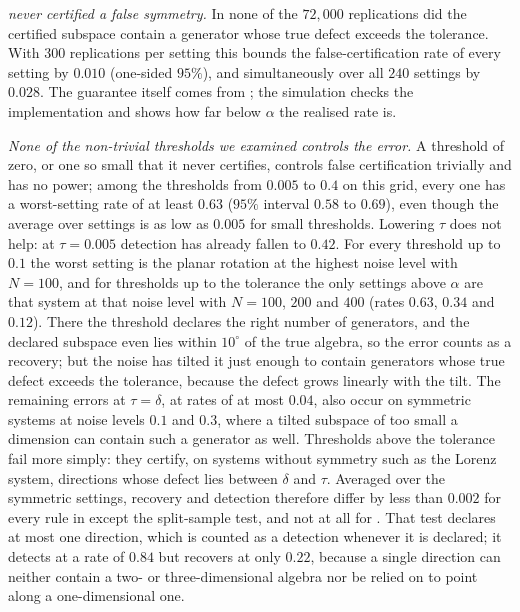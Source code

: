 \symcert{} \emph{never certified a false symmetry.} In none of the $72{,}000$
replications did the certified subspace contain a generator whose true defect
exceeds the tolerance. With $300$ replications per setting this bounds the
false-certification rate of every setting by $0.010$ (one-sided $95\%$), and
simultaneously over all $240$ settings by $0.028$. The guarantee itself comes
from ; the simulation checks the implementation and
shows how far below $\alpha$ the realised rate is.

\emph{None of the non-trivial thresholds we examined controls the error.} A
threshold of zero, or one so small that it never certifies, controls false
certification trivially and has no power; among the thresholds from $0.005$ to
$0.4$ on this grid, every one has a worst-setting rate of at least $0.63$
($95\%$ interval $0.58$ to $0.69$), even though the average over settings is as
low as $0.005$ for small thresholds. Lowering $\tau$ does not help: at $\tau =
0.005$ detection has already fallen to $0.42$. For every threshold up to $0.1$
the worst setting is the planar rotation at the highest noise level with $N =
100$, and for thresholds up to the tolerance the only settings above $\alpha$
are that system at that noise level with $N = 100$, $200$ and $400$ (rates
$0.63$, $0.34$ and $0.12$). There the threshold declares the right number of
generators, and the declared subspace even lies within $10^\circ$ of the true
algebra, so the error counts as a recovery; but the noise has tilted it just
enough to contain generators whose true defect exceeds the tolerance, because
the defect grows linearly with the tilt. The remaining errors at $\tau =
\delta$, at rates of at most $0.04$, also occur on symmetric systems at noise
levels $0.1$ and $0.3$, where a tilted subspace of too small a dimension can
contain such a generator as well. Thresholds above the tolerance fail more
simply: they certify, on systems without symmetry such as the Lorenz system,
directions whose defect lies between $\delta$ and $\tau$. Averaged over the
symmetric settings, recovery and detection therefore differ by less than
$0.002$ for every rule in  except the split-sample test,
and not at all for \symcert{}. That test declares at most one direction, which
is counted as a detection whenever it is declared; it detects at a rate of
$0.84$ but recovers at only $0.22$, because a single direction can neither
contain a two- or three-dimensional algebra nor be relied on to point along a
one-dimensional one.

